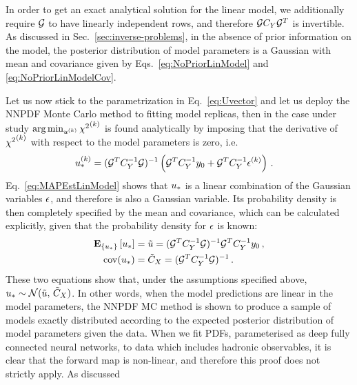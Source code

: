 In order to get an exact analytical solution for the linear model, we
additionally require $\mathcal{G}$ to have linearly independent rows, and therefore
$\mathcal{G} C_{Y} \mathcal{G}^T$ is invertible. As discussed in
Sec.~\ref{sec:inverse-problems}, in the absence of prior information on the
model, the posterior distribution of model parameters is a Gaussian with mean
and covariance given by Eqs.~\ref{eq:NoPriorLinModel} and
\ref{eq:NoPriorLinModelCov}.

Let us now stick to the parametrization in Eq.~\ref{eq:Uvector} and let us
deploy the NNPDF Monte Carlo method to fitting model replicas, then in the case
under study $\arg\min_{u^{(k)}} {\chi^2}^{(k)}$ is found analytically by
imposing that the derivative of ${\chi^2}^{(k)}$ with respect to the model parameters
is zero, i.e.
\begin{equation}
    \begin{split}
        \label{eq:MAPEstLinModel}
        u_*^{(k)} &= (\mathcal{G}^T C_{Y}^{-1} \mathcal{G})^{-1}
        \left(
            \mathcal{G}^T C_{Y}^{-1} y_0 +
            \mathcal{G}^T C_{Y}^{-1} \epsilon^{(k)}
        \right) \, .
    \end{split}
\end{equation}
Eq.~\ref{eq:MAPEstLinModel} shows that $u_*$ is a linear combination of
the Gaussian variables $\epsilon$, and therefore is also a Gaussian variable. Its
probability density is then completely specified by the mean and covariance,
which can be calculated explicitly, given that the probability density for
$\epsilon$ is known:
\begin{align}
    \mathbf{E}_{\{ u_* \}} \left[ u_* \right] &=
    \tilde{u} = (\mathcal{G}^T C_{Y}^{-1} \mathcal{G})^{-1} \mathcal{G}^T
    C_{Y}^{-1} y_0\, , \\
    {\rm cov}(u_*) &= \tilde{C}_X = (\mathcal{G}^T C_{Y}^{-1} \mathcal{G})^{-1} \, .
\end{align}
These two equations show that, under the assumptions specified above,
$u_* \sim \mathcal{N}(\tilde{u}, \, \tilde{C}_X)$. In other
words, when the model predictions are linear in the model parameters, the NNPDF
MC method is shown to produce a sample of models exactly distributed according
to the expected posterior distribution of model parameters given the data. When
we fit PDFs, parameterised as deep fully connected neural networks, to data
which includes hadronic observables, it is clear that the forward map is
non-linear, and therefore this proof does not strictly apply. As discussed
